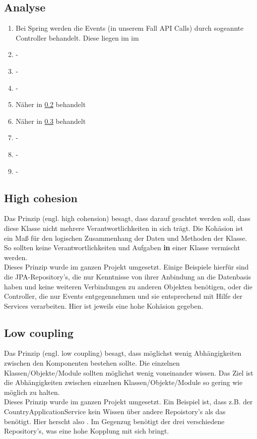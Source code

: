 	\newpage
		
		\subsection{Analyse}
		\begin{enumerate}
			\item Bei Spring werden die Events (in unserem Fall API Calls) durch sogeannte Controller behandelt. Diese liegen im  im 
			\item -
			\item -
			\item -
			\item Näher in \cref{3.highCohesion} behandelt
			\item Näher in \cref{3.lowCoupling} behandelt
			\item -
			\item -
			\item -
 		\end{enumerate}
	
			\subsection{High cohesion \cite{kohaesion.google}} \label{3.highCohesion}
			Das Prinzip  (engl. high cohension) besagt, dass darauf geachtet werden soll, dass diese Klasse nicht mehrere Verantwortlichkeiten in sich trägt. Die Kohäsion ist ein Maß für den logischen Zusammenhang der Daten und Methoden der Klasse. So sollten keine Verantwortlichkeiten und Aufgaben \textbf{in} einer Klasse vermischt werden. \\
			Dieses Prinzip wurde im ganzen Projekt umgesetzt. Einige Beispiele hierfür sind die JPA-Repository's, die nur Kenntnisse von ihrer Anbindung an die Datenbasis haben und keine weiteren Verbindungen zu anderen Objekten benötigen, oder die Controller, die nur Events entgegennehmen und sie entsprechend mit Hilfe der Services verarbeiten. Hier ist jeweils eine hohe Kohäsion gegeben.
			
			\subsection{Low coupling \cite{kohaesion.google}} \label{3.lowCoupling}
			Das Prinzip  (engl. low coupling) besagt, dass möglichst wenig Abhängigkeiten zwischen den Komponenten bestehen sollte. Die einzelnen Klassen/Objekte/Module sollten möglichst wenig voneinander wissen. Das Ziel ist die Abhängigkeiten zwischen einzelnen Klassen/Objekte/Module so gering wie möglich zu halten. \\
			Dieses Prinzip wurde im ganzen Projekt umgesetzt. Ein Beispiel ist, dass z.B. der CountryApplicationService kein Wissen über andere Repoistory's als das  benötigt. Hier herscht also . Im Gegenzug benötigt der  drei verschiedene Repository's, was eine hohe Kopplung mit sich bringt.
			
